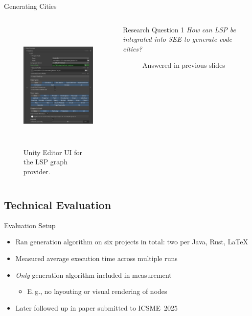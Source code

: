 \documentclass[xcolor={dvipsnames},aspectratio=169,compress,final]{beamer}
\newcommand{\follows}{\raisebox{-0.7mm}{\scalebox{1.4}{\textcolor{Maroon}{\ding{43}}}}}
\newcommand{\answer}[1]{\begin{description}\item[\follows{}]{#1}\end{description}}
\begin{document}
\begin{frame}{Generating Cities}
	\begin{columns}
		\begin{figure}
			\begin{center}
				\includegraphics[height=6.5cm]{figures/unity_lsp_provider}
			\end{center}
			\caption{Unity Editor UI for the LSP graph provider.}
		\end{figure}

		\begin{alertblock}{Research Question 1}
			\emph{How can LSP be integrated into SEE to generate code cities?}
			\answer{\small Answered in previous slides}
		\end{alertblock}
	\end{columns}

\end{frame}

\subsection{Technical Evaluation}

\begin{frame}{Evaluation Setup}
	\begin{itemize}
		\item Ran generation algorithm on six projects in total: two per Java, Rust, \LaTeX{}
		\item Measured average execution time across multiple runs
		\item \emph{Only} generation algorithm included in measurement
		      \begin{itemize}
			      \item E.\,g., no layouting or visual rendering of nodes
		      \end{itemize}
		\item Later followed up in paper submitted to ICSME~2025
	\end{itemize}
\end{frame}
\end{document}
